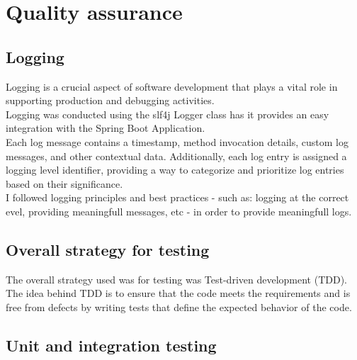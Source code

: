 \documentclass[12pt]{article}
\begin{document}
\section{Quality assurance}

\subsection{Logging}

Logging is a crucial aspect of software development that plays a vital role in supporting production and debugging activities. \\
Logging was conducted using the slf4j Logger class has it provides an easy integration with the Spring Boot Application.\\
Each log message contains a timestamp, method invocation details, custom log messages, and other contextual data. Additionally, each log entry is assigned a logging level identifier, providing a way to categorize and prioritize log entries based on their significance.\\
I followed logging principles and best practices - such as: logging at the correct evel, providing meaningfull messages, etc - in order to provide meaningfull logs.

\subsection{Overall strategy for testing}

The overall strategy used was for testing was Test-driven development (TDD). The idea behind TDD is to ensure that the code meets the requirements and is free from defects by writing tests that define the expected behavior of the code. 

\subsection{Unit and integration testing}
\end{document}
